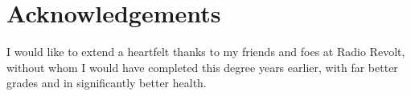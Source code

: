 \documentclass[b5paper]{report}
\begin{document}
\newpage



\chapter*{Acknowledgements}
\thispagestyle{empty}
I would like to extend a heartfelt thanks to my friends and foes at Radio Revolt, without whom I would have completed this degree years earlier, with far better grades and in significantly better health.






\tableofcontents









\printskelnotes{}
\printbibliography

\begin{appendices}
  
\end{appendices}
\end{document}
